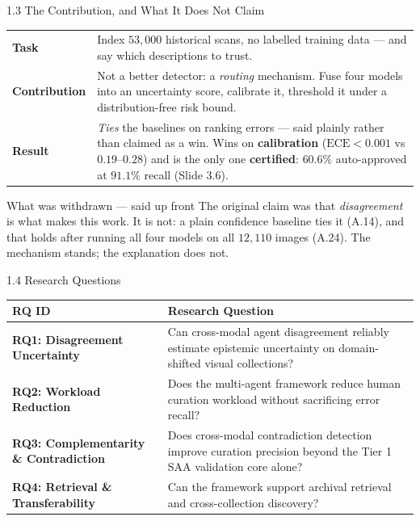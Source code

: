 \documentclass[aspectratio=169,11pt]{beamer}
\begin{document}
\begin{frame}{1.3 The Contribution, and What It Does Not Claim}
\scriptsize
\begin{center}
\begin{tabular}{@{}p{1.9cm} p{10.2cm}@{}}
\toprule
\textbf{Task} & Index $53{,}000$ historical scans, no labelled training data --- and say which descriptions to trust. \\
\addlinespace
\textbf{Contribution} & Not a better detector: a \emph{routing} mechanism. Fuse four models into an uncertainty score, calibrate it, threshold it under a distribution-free risk bound. \\
\addlinespace
\textbf{Result} & \emph{Ties} the baselines on ranking errors --- said plainly rather than claimed as a win. Wins on \textbf{calibration} ($\text{ECE}<0.001$ vs $0.19$--$0.28$) and is the only one \textbf{certified}: $60.6\%$ auto-approved at $91.1\%$ recall (Slide 3.6). \\
\bottomrule
\end{tabular}
\end{center}
\vspace{-1mm}
\begin{alertblock}{\scriptsize What was withdrawn --- said up front}
\scriptsize The original claim was that \emph{disagreement} is what makes this work. It is not: a plain confidence baseline ties it (A.14), and that holds after running all four models on all $12{,}110$ images (A.24). The mechanism stands; the explanation does not.
\end{alertblock}
\end{frame}

\begin{frame}{1.4 Research Questions}
\scriptsize
\centering
\begin{table}[!htbp]
\begin{tabular}{p{3.2cm}p{9.0cm}}
\toprule
\textbf{RQ ID} & \textbf{Research Question} \\
\midrule
\textbf{RQ1: Disagreement Uncertainty} & Can cross-modal agent disagreement reliably estimate epistemic uncertainty on domain-shifted visual collections? \\
\textbf{RQ2: Workload Reduction} & Does the multi-agent framework reduce human curation workload without sacrificing error recall? \\
\textbf{RQ3: Complementarity \& Contradiction} & Does cross-modal contradiction detection improve curation precision beyond the Tier 1 SAA validation core alone? \\
\textbf{RQ4: Retrieval \& Transferability} & Can the framework support archival retrieval and cross-collection discovery? \\
\bottomrule
\end{tabular}
\end{table}
\end{frame}
\end{document}

